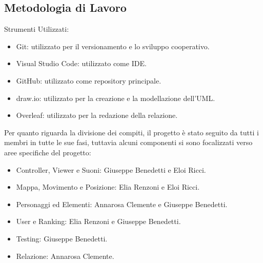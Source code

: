 \documentclass[12pt, letterpaper]{article}
\begin{document}
    \subsection{Metodologia di Lavoro}
        Strumenti Utilizzati: 
        \begin{itemize}
            \item Git: utilizzato per il versionamento e lo sviluppo cooperativo.
            \item Visual Studio Code: utilizzato come IDE.
            \item GitHub: utilizzato come repository principale.
            \item draw.io: utilizzato per la creazione e la modellazione dell'UML.
            \item Overleaf: utilizzato per la redazione della relazione.
        \end{itemize} 
        Per quanto riguarda la divisione dei compiti, il progetto è stato seguito da tutti i membri in tutte le sue fasi, tuttavia alcuni componenti si sono focalizzati verso aree specifiche del progetto:
        \begin{itemize}
            \item Controller, Viewer e Suoni: Giuseppe Benedetti e Eloi Ricci.
            \item Mappa, Movimento e Posizione: Elia Renzoni e Eloi Ricci.
            \item Personaggi ed Elementi: Annarosa Clemente e Giuseppe Benedetti.
            \item User e Ranking: Elia Renzoni e Giuseppe Benedetti.
            \item Testing: Giuseppe Benedetti.
            \item Relazione: Annarosa Clemente.
        \end{itemize}
    \newpage
\end{document}
